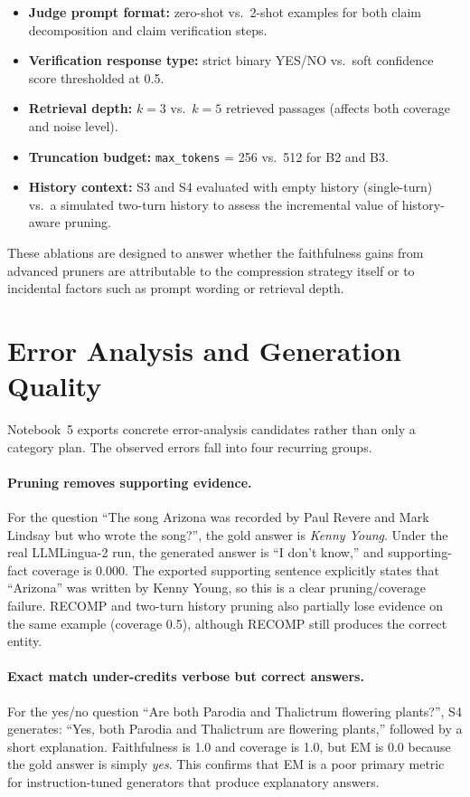 \documentclass[11pt,a4paper]{article}
\begin{document}
\begin{itemize}[nosep]
    \item \textbf{Judge prompt format:} zero-shot vs.\ 2-shot examples for both claim decomposition and claim verification steps.
    \item \textbf{Verification response type:} strict binary YES/NO vs.\ soft confidence score thresholded at 0.5.
    \item \textbf{Retrieval depth:} $k=3$ vs.\ $k=5$ retrieved passages (affects both coverage and noise level).
    \item \textbf{Truncation budget:} \texttt{max\_tokens} = 256 vs.\ 512 for B2 and B3.
    \item \textbf{History context:} S3 and S4 evaluated with empty history (single-turn) vs.\ a simulated two-turn history to assess the incremental value of history-aware pruning.
\end{itemize}

These ablations are designed to answer whether the faithfulness gains from advanced pruners are attributable to the compression strategy itself or to incidental factors such as prompt wording or retrieval depth.


\section{Error Analysis and Generation Quality}

Notebook~5 exports concrete error-analysis candidates rather than only a category plan. The observed errors fall into four recurring groups.

\paragraph{Pruning removes supporting evidence.}
For the question ``The song Arizona was recorded by Paul Revere and Mark Lindsay but who wrote the song?'', the gold answer is \textit{Kenny Young}. Under the real LLMLingua-2 run, the generated answer is ``I don't know,'' and supporting-fact coverage is 0.000. The exported supporting sentence explicitly states that ``Arizona'' was written by Kenny Young, so this is a clear pruning/coverage failure. RECOMP and two-turn history pruning also partially lose evidence on the same example (coverage 0.5), although RECOMP still produces the correct entity.

\paragraph{Exact match under-credits verbose but correct answers.}
For the yes/no question ``Are both Parodia and Thalictrum flowering plants?'', S4 generates: ``Yes, both Parodia and Thalictrum are flowering plants,'' followed by a short explanation. Faithfulness is 1.0 and coverage is 1.0, but EM is 0.0 because the gold answer is simply \textit{yes}. This confirms that EM is a poor primary metric for instruction-tuned generators that produce explanatory answers.
\end{document}
